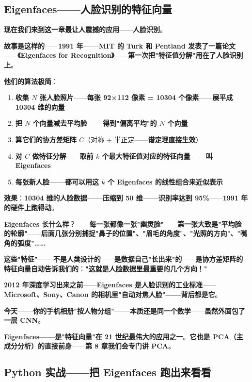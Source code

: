 \subsection{Eigenfaces——人脸识别的特征向量}

\textbf{现在我们来到这一章最让人震撼的应用}——\textbf{人脸识别}。

\textbf{故事是这样的}——\textbf{1991 年——MIT 的 Turk 和 Pentland 发表了一篇论文}——\textbf{《Eigenfaces for Recognition》}——\textbf{第一次把"特征值分解"用在了人脸识别上}。

\textbf{他们的算法极简}：

\begin{enumerate}
\item \textbf{收集 $N$ 张人脸照片}——\textbf{每张 92×112 像素 = 10304 个像素}——\textbf{展平成 10304 维的向量}
\item \textbf{把 $N$ 个向量减去平均脸——得到"偏离平均"的 $N$ 个向量}
\item \textbf{算它们的协方差矩阵 $C$}（对称 + 半正定——\textbf{谱定理直接生效}）
\item \textbf{对 $C$ 做特征分解}——\textbf{取前 $k$ 个最大特征值对应的特征向量——叫 Eigenfaces}
\item \textbf{每张新人脸——都可以用这 $k$ 个 Eigenfaces 的线性组合来近似表示}
\end{enumerate}

\textbf{效果}：\textbf{10304 维的人脸数据——压缩到 50 维——识别率达到 95\%}——\textbf{1991 年的硬件上跑得动}。

\textbf{Eigenfaces 长什么样}？——\textbf{每一张都像一张"幽灵脸"}——\textbf{第一张大致是"平均脸的轮廓"}——\textbf{后面几张分别捕捉"鼻子的位置"、"眉毛的角度"、"光照的方向"、"嘴角的弧度"……}

\textbf{这些"特征"——不是人类设计的}——\textbf{是数据自己"长出来"的}——\textbf{是协方差矩阵的特征向量自动告诉我们的}：\textbf{"这就是人脸数据里最重要的几个方向！"}

\textbf{2012 年深度学习出来之前}——\textbf{Eigenfaces 是人脸识别的工业标准}——\textbf{Microsoft、Sony、Canon 的相机里"自动对焦人脸"——背后都是它}。

\textbf{今天——你的手机相册"按人物分组"——本质还是同一个数学}——\textbf{虽然外面包了一层 CNN}。

\textbf{Eigenfaces——是"特征向量"在 21 世纪最伟大的应用之一}。\textbf{它也是 PCA（主成分分析）的直接前身}——\textbf{第 8 章我们会专门讲 PCA}。

\subsection{Python 实战——把 Eigenfaces 跑出来看看}

